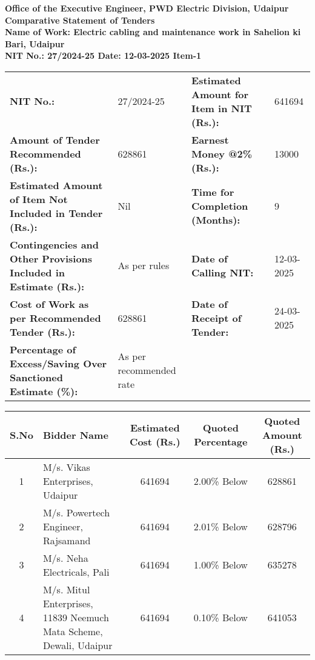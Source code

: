 \documentclass[a4paper,landscape]{article}
\begin{document}
\begin{center}
    \textbf{\Large Office of the Executive Engineer, PWD Electric Division, Udaipur} \\
    \vspace{0.5cm}
    \textbf{Comparative Statement of Tenders} \\
    \vspace{0.3cm}
    \textbf{Name of Work: Electric cabling and maintenance work in Sahelion ki Bari, Udaipur} \\
    \textbf{NIT No.: 27/2024-25 \quad Date: 12-03-2025 \quad Item-1}
\end{center}

\begin{center}
    \begin{tabular}{p{} p{} p{} p{}}
        \toprule
        \textbf{NIT No.:} & 27/2024-25 & \textbf{Estimated Amount for Item in NIT (Rs.):} & 641694 \\
        \textbf{Amount of Tender Recommended (Rs.):} & 628861 & \textbf{Earnest Money @2\% (Rs.):} & 13000 \\
        \textbf{Estimated Amount of Item Not Included in Tender (Rs.):} & Nil & \textbf{Time for Completion (Months):} & 9 \\
        \textbf{Contingencies and Other Provisions Included in Estimate (Rs.):} & As per rules & \textbf{Date of Calling NIT:} & 12-03-2025 \\
        \textbf{Cost of Work as per Recommended Tender (Rs.):} & 628861 & \textbf{Date of Receipt of Tender:} & 24-03-2025 \\
        \textbf{Percentage of Excess/Saving Over Sanctioned Estimate (\%):} & As per recommended rate & & \\
        \bottomrule
    \end{tabular}
\end{center}

\vspace{0.5cm}
\begin{center}
    \begin{tabular}{|c|p{}|c|c|c|}
        \hline
        \textbf{S.No} & \textbf{Bidder Name} & \textbf{Estimated Cost (Rs.)} & \textbf{Quoted Percentage} & \textbf{Quoted Amount (Rs.)} \\
        \hline
        1 & M/s. Vikas Enterprises, Udaipur & 641694 & 2.00\% Below & 628861 \\
        2 & M/s. Powertech Engineer, Rajsamand & 641694 & 2.01\% Below & 628796 \\
        3 & M/s. Neha Electricals, Pali & 641694 & 1.00\% Below & 635278 \\
        4 & M/s. Mitul Enterprises, 11839 Neemuch Mata Scheme, Dewali, Udaipur & 641694 & 0.10\% Below & 641053 \\
        \hline
    \end{tabular}
\end{center}
\end{document}
